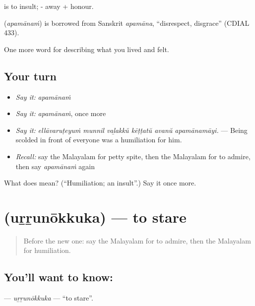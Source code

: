  is to insult; - away +  honour.

\begin{cousinweb}
\textbf{} (\emph{apamānaṁ}) is borrowed from Sanskrit \emph{apamāna}, \textquotedblleft{}disrespect, disgrace\textquotedblright{} (CDIAL 433).
\end{cousinweb}

\begin{grammarlens}[title={What you've built}]
One more word for describing what you lived and felt.
\end{grammarlens}

\subsection*{Your turn}
\begin{itemize}
\raggedright
  \item \emph{Say it:} \emph{apamānaṁ}
  \item \emph{Say it:} \emph{apamānaṁ}, once more
  \item \emph{Say it:} \emph{ellāvaruṭeyuṁ munnil vaḻakkŭ kēṭṭatŭ avanŭ apamānamāyi.} — Being scolded in front of everyone was a humiliation for him.
  \item \emph{Recall:} say the Malayalam for petty spite, then the Malayalam for to admire, then say \emph{apamānaṁ} again
\end{itemize}

\begin{tcolorbox}[breakable,colback=teal!4,colframe=teal!35!black,title={Before you move on}]
What does  mean? (\textquotedblleft{}Humiliation; an insult\textquotedblright{}.) Say it once more.
\end{tcolorbox}
\section[\texorpdfstring{\ml{ഉറ്റുനോക്കുക} (uṟṟunōkkuka)}{ഉറ്റുനോക്കുക (uṟṟunōkkuka)}]{ (uṟṟunōkkuka) — to stare}

\label{lesson:ML-C524-urrunokkuka}



\begin{quote}
Before the new one: say the Malayalam for to admire, then the Malayalam for humiliation.
\end{quote}

\subsection*{You'll want to know: }
\textbf{} — \emph{uṟṟunōkkuka} — \textquotedblleft{}to stare\textquotedblright{}.

